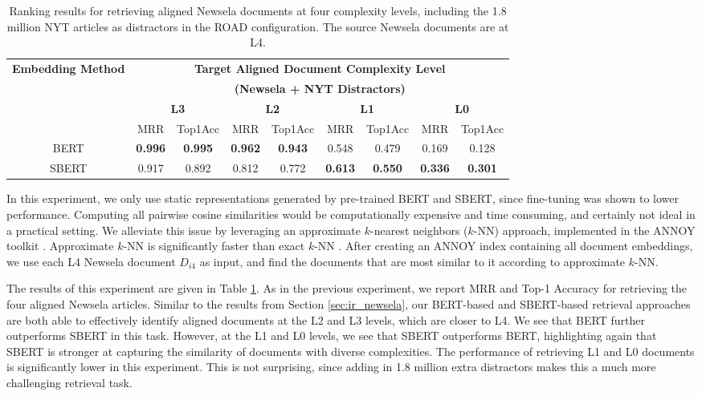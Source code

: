 \documentclass[thesis.tex]{subfiles}
\begin{document}
\begin{table}
\begin{center}
\small
\begin{tabular}{|c|cc|cc|cc|cc|}
\hline
\multirow{4}{2cm}{\centering \textbf{Embedding Method}} & \multicolumn{8}{|c|}{\textbf{Target Aligned Document Complexity Level}} \\
& \multicolumn{8}{|c|}{\textbf{(Newsela + NYT Distractors)}} \\
& \multicolumn{2}{|c|}{\textbf{L3}} & \multicolumn{2}{|c|}{\textbf{L2}} & \multicolumn{2}{|c|}{\textbf{L1}} & \multicolumn{2}{|c|}{\textbf{L0}} \\
& MRR & Top1Acc & MRR & Top1Acc & MRR & Top1Acc & MRR & Top1Acc \\ \hline
BERT & \textbf{0.996} & 
\textbf{0.995} & \textbf{0.962} & \textbf{0.943} & 0.548 & 0.479 & 0.169 & 0.128 \\
SBERT & 0.917 & 0.892 & 0.812 & 0.772 & \textbf{0.613} & \textbf{0.550} & \textbf{0.336} & \textbf{0.301} \\ \hline
\end{tabular}
\end{center}
\caption{\label{table:ir_nyt} Ranking results for retrieving aligned Newsela documents at four complexity levels, including the 1.8 million NYT articles as distractors in the ROAD configuration. The source Newsela documents are at L4.}
\end{table}

In this experiment, we only use static representations generated by pre-trained BERT and SBERT, since fine-tuning was shown to lower performance. Computing all pairwise cosine similarities would be computationally expensive and time consuming, and certainly not ideal in a practical setting. We alleviate this issue by leveraging an approximate $k$-nearest neighbors ($k$-NN) approach, implemented in the ANNOY toolkit \citep{bernhardsson2018annoy}. Approximate $k$-NN is significantly faster than exact $k$-NN \citep{patel2018magnitude}. After creating an ANNOY index containing all document embeddings, we use each L4 Newsela document $D_{i4}$ as input, and find the documents that are most similar to it according to approximate $k$-NN.

The results of this experiment are given in Table \ref{table:ir_nyt}. As in the previous experiment, we report MRR and Top-1 Accuracy for retrieving the four aligned Newsela articles. Similar to the results from Section \ref{sec:ir_newsela}, our BERT-based and SBERT-based retrieval approaches are both able to effectively identify aligned documents at the L2 and L3 levels, which are closer to L4. We see that BERT further outperforms SBERT in this task. However, at the L1 and L0 levels, we see that SBERT outperforms BERT, highlighting again that SBERT is stronger at capturing the similarity of documents with diverse complexities. The performance of retrieving L1 and L0 documents is significantly lower in this experiment. This is not surprising, since adding in 1.8 million extra distractors makes this a much more challenging retrieval task.
\end{document}
